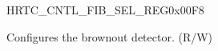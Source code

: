\begin{register}{H}{RTC\_CNTL\_FIB\_SEL\_REG}{0x00F8}\label{regdesc:RTCCNTLFIBSELREG}
%
%
\regnewline%
\begin{regdesc}\begin{reglist}
\label{fielddesc:RTCCNTLRTCFIBSEL}\item [RTC\_CNTL\_RTC\_FIB\_SEL] Configures the brownout detector. (R/W)
\end{reglist}\end{regdesc}
\end{register}
